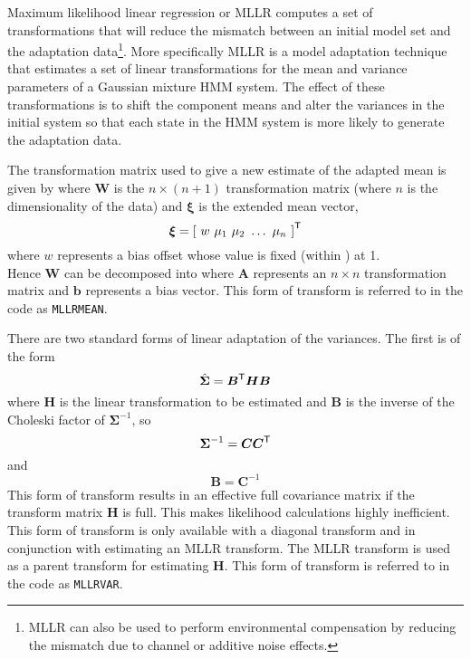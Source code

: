 
Maximum likelihood linear regression or MLLR
computes a set of transformations that will reduce the mismatch
between an initial model set and the adaptation data\footnote{
MLLR can also be used to perform environmental compensation by
reducing the mismatch due to channel or additive noise effects.}.
More specifically MLLR is a model adaptation technique
that estimates a set of linear transformations for the mean and
variance parameters of a Gaussian mixture HMM system. 
The effect of these transformations is to shift the
component means and alter the variances in the initial system 
so that each state in the HMM system is more likely to generate the 
adaptation data.

The transformation matrix used to give a new estimate of the adapted mean is
given by
where $\bm{W}$ is the $n \times \left( n + 1 \right)$
transformation matrix (where $n$ is the dimensionality of the data)
and $\bm{\xi}$ is the extended mean vector,
\[
        {\mbox{\boldmath $\xi$}} = \left[\mbox{ }w\mbox{ }\mu_1\mbox{ }\mu_2\mbox{ }\dots\mbox{ }\mu_n\mbox{ }\right]^{\scriptstyle\sf T}
\]
where $w$ represents a bias offset whose value is fixed (within \HTK) at 1.\\
Hence $\bm{W}$ can be decomposed into
where $\bm{A}$ represents an $n \times n$
transformation matrix and $\bm{b}$ represents a bias vector. This
form of transform is referred to in the code as {\tt MLLRMEAN}.


There are two standard forms of linear adaptation of the variances. The first
is of the form
\[
        \hat{{\mbox{\boldmath $\Sigma$}}} = {\mbox{\boldmath $B$}}^{\scriptstyle\sf T}{\mbox{\boldmath $H$}}{\mbox{\boldmath $B$}}
\]
where $\bm{H}$ is the linear transformation to be estimated and
$\bm{B}$ is the inverse of the Choleski factor of $\bm{\Sigma}^{-1}$,
so
\[ 
        {\mbox{\boldmath $\Sigma$}}^{-1} = {\mbox{\boldmath $C$}}{\mbox{\boldmath $C$}}^{\scriptstyle\sf T}
\]
and
\[
        \bm{B}= \bm{C}^{-1}
\]
This form of transform results in an effective full covariance matrix if
the transform matrix $\bm{H}$ is full. This makes likelihood calculations
highly inefficient. This form of transform is only available with a 
diagonal transform and in conjunction with estimating an MLLR transform. The
MLLR transform is used as a parent transform for estimating $\bm{H}$.
This form of transform is referred to in the code as {\tt MLLRVAR}.

